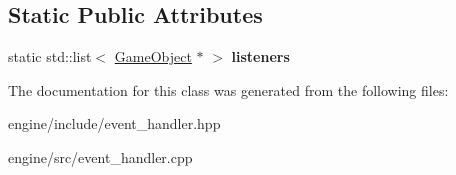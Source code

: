 \subsection*{Static Public Attributes}
\begin{DoxyCompactItemize}
\item 
static std\+::list$<$ \hyperlink{classengine_1_1_game_object}{Game\+Object} $\ast$ $>$ {\bfseries listeners}\hypertarget{classengine_1_1_event_handler_aabe7a62c9fdb036d998630f4ed86d2de}{}\label{classengine_1_1_event_handler_aabe7a62c9fdb036d998630f4ed86d2de}

\end{DoxyCompactItemize}


The documentation for this class was generated from the following files\+:\begin{DoxyCompactItemize}
\item 
engine/include/event\+\_\+handler.\+hpp\item 
engine/src/event\+\_\+handler.\+cpp\end{DoxyCompactItemize}
